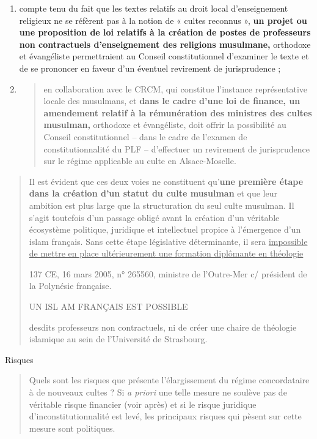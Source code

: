 \begin{enumerate}
\def\labelenumi{\alph{enumi}.}
\item
  compte tenu du fait que les textes relatifs au droit local
  d'enseignement religieux ne se réfèrent pas à la notion de « cultes
  reconnus », \textbf{un projet ou une proposition de loi relatifs à la
  création de postes de professeurs non contractuels d'enseignement des
  religions musulmane,} orthodoxe et évangéliste permettraient au
  Conseil constitutionnel d'examiner le texte et de se prononcer en
  faveur d'un éventuel revirement de jurisprudence ;
\item
  \begin{quote}
  en collaboration avec le CRCM, qui constitue l'instance représentative
  locale des musulmans, et \textbf{dans le cadre d'une loi de finance,
  un amendement relatif à la rémunération des ministres des cultes
  musulman,} orthodoxe et évangéliste, doit offrir la possibilité au
  Conseil constitutionnel -- dans le cadre de l'examen de
  constitutionnalité du PLF -- d'effectuer un revirement de
  jurisprudence sur le régime applicable au culte en Alsace-Moselle.
  \end{quote}
\end{enumerate}

\begin{quote}
Il est évident que ces deux voies ne constituent qu'\textbf{une première
étape dans la création d'un statut du culte musulman} et que leur
ambition est plus large que la structuration du seul culte musulman. Il
s'agit toutefois d'un passage obligé avant la création d'un véritable
écosystème politique, juridique et intellectuel propice à l'émergence
d'un islam français. Sans cette étape législative déterminante, il sera
\underline{impossible de mettre en place ultérieurement une formation
diplômante en théologie}

137 CE, 16 mars 2005, n° 265560, ministre de l'Outre-Mer c/ président de
la Polynésie française.

UN ISL AM FRANÇAIS EST POSSIBLE

desdits professeurs non contractuels, ni de créer une chaire de
théologie islamique au sein de l'Université de Strasbourg.
\end{quote}

Risques

\begin{quote}
Quels sont les risques que présente l'élargissement du régime
concordataire à de nouveaux cultes ? Si \emph{a priori} une telle mesure
ne soulève pas de véritable risque financier (voir après) et si le
risque juridique d'inconstitutionnalité est levé, les principaux risques
qui pèsent sur cette mesure sont politiques.
\end{quote}


